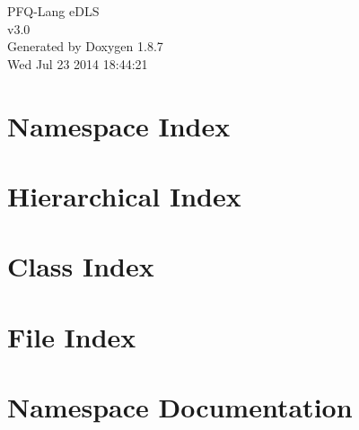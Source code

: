 \documentclass[twoside]{book}
\newcommand{\+}{\discretionary{\mbox{\scriptsize$\hookleftarrow$}}{}{}}
\newcommand{\clearemptydoublepage}{%
  \newpage{\pagestyle{empty}\cleardoublepage}%
}
\begin{document}
\hypersetup{pageanchor=false,
             bookmarks=true,
             bookmarksnumbered=true,
             pdfencoding=unicode
            }
\begin{titlepage}
\vspace*{7cm}
\begin{center}%
{\Large P\+F\+Q-\/\+Lang e\+D\+L\+S \\[1ex]\large v3.\+0 }\\
\vspace*{1cm}
{\large Generated by Doxygen 1.8.7}\\
\vspace*{0.5cm}
{\small Wed Jul 23 2014 18:44:21}\\
\end{center}
\end{titlepage}
\clearemptydoublepage
\tableofcontents
\clearemptydoublepage
{}
\hypersetup{pageanchor=true}

\chapter{Namespace Index}

\chapter{Hierarchical Index}

\chapter{Class Index}

\chapter{File Index}

\chapter{Namespace Documentation}





\end{document}
